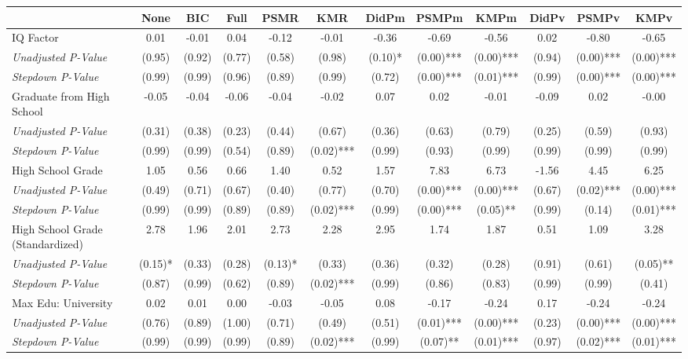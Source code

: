 \begin{tabular}{l c c c c c c c c c c c}
\toprule
 & None & BIC & Full & PSMR & KMR & DidPm & PSMPm & KMPm & DidPv & PSMPv & KMPv \\
\midrule
IQ Factor & 0.01 & -0.01 & 0.04 & -0.12 & -0.01 & -0.36 & -0.69 & -0.56 & 0.02 & -0.80 & -0.65 \\
\quad \textit{Unadjusted P-Value} & (0.95) & (0.92) & (0.77) & (0.58) & (0.98) & (0.10)* & (0.00)*** & (0.00)*** & (0.94) & (0.00)*** & (0.00)*** \\
\quad \textit{Stepdown P-Value} & (0.99) & (0.99) & (0.96) & (0.89) & (0.99) & (0.72) & (0.00)*** & (0.01)*** & (0.99) & (0.00)*** & (0.00)*** \\
Graduate from High School & -0.05 & -0.04 & -0.06 & -0.04 & -0.02 & 0.07 & 0.02 & -0.01 & -0.09 & 0.02 & -0.00 \\
\quad \textit{Unadjusted P-Value} & (0.31) & (0.38) & (0.23) & (0.44) & (0.67) & (0.36) & (0.63) & (0.79) & (0.25) & (0.59) & (0.93) \\
\quad \textit{Stepdown P-Value} & (0.99) & (0.99) & (0.54) & (0.89) & (0.02)*** & (0.99) & (0.93) & (0.99) & (0.99) & (0.99) & (0.99) \\
High School Grade & 1.05 & 0.56 & 0.66 & 1.40 & 0.52 & 1.57 & 7.83 & 6.73 & -1.56 & 4.45 & 6.25 \\
\quad \textit{Unadjusted P-Value} & (0.49) & (0.71) & (0.67) & (0.40) & (0.77) & (0.70) & (0.00)*** & (0.00)*** & (0.67) & (0.02)*** & (0.00)*** \\
\quad \textit{Stepdown P-Value} & (0.99) & (0.99) & (0.89) & (0.89) & (0.02)*** & (0.99) & (0.00)*** & (0.05)** & (0.99) & (0.14) & (0.01)*** \\
High School Grade (Standardized) & 2.78 & 1.96 & 2.01 & 2.73 & 2.28 & 2.95 & 1.74 & 1.87 & 0.51 & 1.09 & 3.28 \\
\quad \textit{Unadjusted P-Value} & (0.15)* & (0.33) & (0.28) & (0.13)* & (0.33) & (0.36) & (0.32) & (0.28) & (0.91) & (0.61) & (0.05)** \\
\quad \textit{Stepdown P-Value} & (0.87) & (0.99) & (0.62) & (0.89) & (0.02)*** & (0.99) & (0.86) & (0.83) & (0.99) & (0.99) & (0.41) \\
Max Edu: University & 0.02 & 0.01 & 0.00 & -0.03 & -0.05 & 0.08 & -0.17 & -0.24 & 0.17 & -0.24 & -0.24 \\
\quad \textit{Unadjusted P-Value} & (0.76) & (0.89) & (1.00) & (0.71) & (0.49) & (0.51) & (0.01)*** & (0.00)*** & (0.23) & (0.00)*** & (0.00)*** \\
\quad \textit{Stepdown P-Value} & (0.99) & (0.99) & (0.99) & (0.89) & (0.02)*** & (0.99) & (0.07)** & (0.01)*** & (0.97) & (0.02)*** & (0.01)*** \\

\end{tabular}
